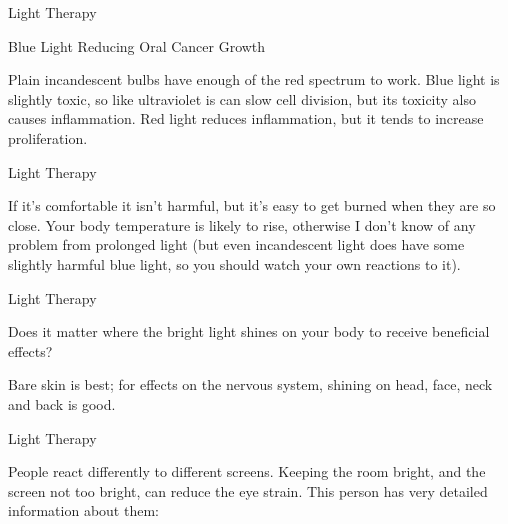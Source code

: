 \documentclass[11pt,oneside,openany,extrafontsizes]{memoir}
\begin{document}
\begin{standalonequote}{Light Therapy}
    \begin{note}
        Blue Light Reducing Oral Cancer Growth
    \end{note}

    \begin{answer}
        Plain incandescent bulbs have enough of the red spectrum to work. Blue light is slightly toxic, so like ultraviolet is can slow cell division, but its toxicity also causes inflammation. Red light reduces inflammation, but it tends to increase proliferation.
    \end{answer}
\end{standalonequote}

\begin{standalonequote}{Light Therapy}

    \begin{answer}
        If it's comfortable it isn't harmful, but it's easy to get burned when they are so close. Your body temperature is likely to rise, otherwise I don't know of any problem from prolonged light (but even incandescent light does have some slightly harmful blue light, so you should watch your own reactions to it).
    \end{answer}
\end{standalonequote}

\begin{qaexchange}{Light Therapy}

    \begin{question}
        Does it matter where the bright light shines on your body to receive beneficial effects?
    \end{question}

    \begin{answer}
        Bare skin is best; for effects on the nervous system, shining on head, face, neck and back is good.
    \end{answer}
\end{qaexchange}

\begin{standalonequote}{Light Therapy}

    \begin{answer}
        People react differently to different screens. Keeping the room bright, and the screen not too bright, can reduce the eye strain. This person has very detailed information about them:
    \end{answer}
\end{standalonequote}
\end{document}
